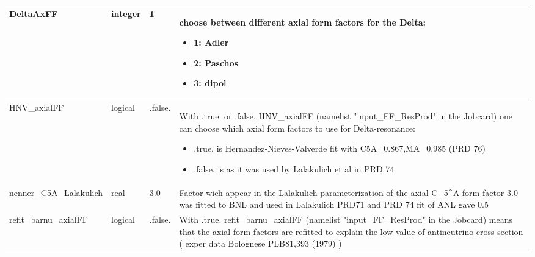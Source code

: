 \documentclass{article}
\begin{document}
\begin{longtable}{llll}
\midrule
DeltaAxFF & \begin{minipage}[t]{2cm}integer\end{minipage} & \begin{minipage}[t]{2cm}1\end{minipage} & \begin{minipage}[t]{12cm}choose between different axial form factors for the Delta:\begin{itemize}\leftmargin0em\itemindent0pt\item 1: Adler\item 2: Paschos\item 3: dipol\end{itemize}\end{minipage}\\*
\midrule
HNV\_axialFF & \begin{minipage}[t]{2cm}logical\end{minipage} & \begin{minipage}[t]{2cm}.false.\end{minipage} & \begin{minipage}[t]{12cm}With .true. or .false. HNV\_axialFF (namelist "input\_FF\_ResProd" in the Jobcard) one can choose which axial form factors to use for Delta-resonance:\begin{itemize}\leftmargin0em\itemindent0pt\item .true. is Hernandez-Nieves-Valverde fit with C5A=0.867,MA=0.985 (PRD 76)\item .false. is as it was used by Lalakulich et al in PRD 74\end{itemize}\end{minipage}\\*
\midrule
nenner\_C5A\_Lalakulich & \begin{minipage}[t]{2cm}real\end{minipage} & \begin{minipage}[t]{2cm}3.0\end{minipage} & \begin{minipage}[t]{12cm}Factor wich appear in the Lalakulich parameterization of the axial C\_5\^{}A form factor 3.0 was fitted to BNL and  used in Lalakulich PRD71 and PRD 74 fit of ANL gave 0.5\end{minipage}\\*
\midrule
refit\_barnu\_axialFF & \begin{minipage}[t]{2cm}logical\end{minipage} & \begin{minipage}[t]{2cm}.false.\end{minipage} & \begin{minipage}[t]{12cm}With .true. refit\_barnu\_axialFF (namelist "input\_FF\_ResProd" in the Jobcard) means that the axial form factors are refitted to explain the low value of antineutrino cross section ( exper data  Bolognese PLB81,393 (1979) )\end{minipage}\\*

\end{longtable}
\end{document}
